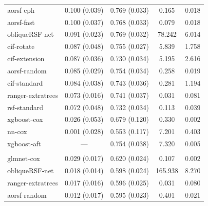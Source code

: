\documentclass[12pt]{article}\usepackage[]{graphicx}\usepackage[]{xcolor}
\newenvironment{knitrout}{}{} %
\begin{document}
\begin{knitrout}
\begin{longtable}[t]{lcccc}
\hspace{1em}aorsf-cph & 0.100 (0.039) & 0.769 (0.033) & 0.165 & 0.018\\
\hspace{1em}aorsf-fast & 0.100 (0.037) & 0.768 (0.033) & 0.079 & 0.018\\
\hspace{1em}obliqueRSF-net & 0.091 (0.023) & 0.769 (0.032) & 78.242 & 6.014\\
\hspace{1em}cif-rotate & 0.087 (0.048) & 0.755 (0.027) & 5.839 & 1.758\\
\hspace{1em}cif-extension & 0.087 (0.036) & 0.730 (0.034) & 5.195 & 2.616\\
\hspace{1em}aorsf-random & 0.085 (0.029) & 0.754 (0.034) & 0.258 & 0.019\\
\hspace{1em}cif-standard & 0.084 (0.038) & 0.743 (0.036) & 0.281 & 1.194\\
\hspace{1em}ranger-extratrees & 0.073 (0.016) & 0.741 (0.037) & 0.031 & 0.081\\
\hspace{1em}rsf-standard & 0.072 (0.048) & 0.732 (0.034) & 0.113 & 0.039\\
\hspace{1em}xgboost-cox & 0.026 (0.053) & 0.679 (0.120) & 0.330 & 0.002\\
\hspace{1em}nn-cox & 0.001 (0.028) & 0.553 (0.117) & 7.201 & 0.403\\
\hspace{1em}xgboost-aft & --- & 0.754 (0.038) & 7.320 & 0.005\\
\addlinespace[0.3em]
\multicolumn{5}{l}{\textit{\textbf{FCL; relapse, n = 541, p = 7}}}\\
\hline
\hspace{1em}glmnet-cox & 0.029 (0.017) & 0.620 (0.024) & 0.107 & 0.002\\
\hspace{1em}obliqueRSF-net & 0.018 (0.014) & 0.598 (0.024) & 165.938 & 8.270\\
\hspace{1em}ranger-extratrees & 0.017 (0.016) & 0.596 (0.025) & 0.031 & 0.080\\
\hspace{1em}aorsf-random & 0.012 (0.017) & 0.595 (0.023) & 0.401 & 0.021\\

\end{longtable}
\end{knitrout}
\end{document}
